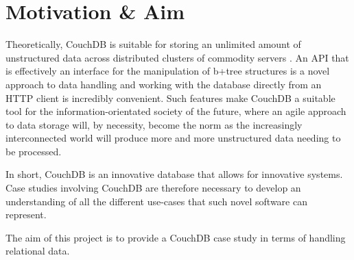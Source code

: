 \section{Motivation \& Aim}
Theoretically, CouchDB is suitable for storing an unlimited amount of unstructured data across distributed clusters of commodity servers \cite{couchdb2.0}. An API that is effectively an interface for the manipulation of b+tree structures is a novel approach to data handling and working with the database directly from an HTTP client is incredibly convenient. Such features make CouchDB a suitable tool for the information-orientated society of the future, where an agile approach to data storage will, by necessity, become the norm as the increasingly interconnected world will produce more and more unstructured data needing to be processed.

In short, CouchDB is an innovative database that allows for innovative systems. Case studies involving CouchDB are therefore necessary to develop an understanding of all the different use-cases that such novel software can represent.

The aim of this project is to provide a CouchDB case study in terms of handling relational data.